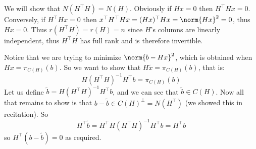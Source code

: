 \eexerc

\benum
    \item We will show that $N(H^\top H)=N(H)$.
    Obviously if $Hx=0$ then $H^\top Hx=0$.
    Conversely, if $H^\top Hx=0$ then $x^\top H^\top Hx=(Hx)^\top Hx=\norm{Hx}^2=0$, thus $Hx=0$.
    Thus $r(H^\top H)=r(H)=n$ since $H$'s columns are linearly independent, thus $H^\top H$ has full rank and is therefore invertible.
    \item Notice that we are trying to minimize $\norm{b-Hx}^2$, which is obtained when $Hx=\pi_{C(H)}(b)$.
    So we want to show that $H\tilde x=\pi_{C(H)}(b)$, that is:
    $$ H(H^\top H)^{-1}H^\top b = \pi_{C(H)}(b) $$
    Let us define $\tilde b=H(H^\top H)^{-1}H^\top b$, and we can see that $\tilde b\in C(H)$.
    Now all that remains to show is that $b-\tilde b\in C(H)^\perp=N(H^\top)$ (we showed this in recitation).
    So
    $$ H^\top\tilde b = H^\top H(H^\top H)^{-1}H^\top b = H^\top b $$
    so $H^\top(b-\tilde b)=0$ as required.
\eenum

\bye
